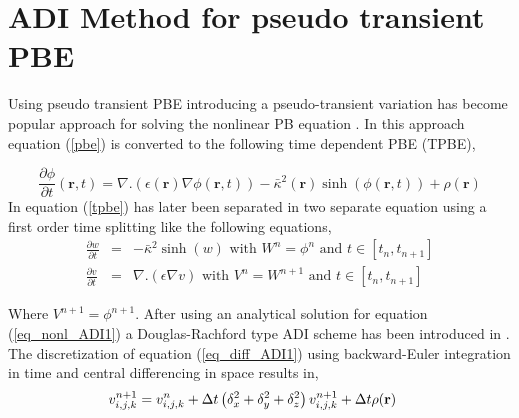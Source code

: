 
\section{ADI Method for pseudo transient PBE}

Using pseudo transient PBE introducing a pseudo-transient variation has become popular approach for solving the nonlinear PB equation \cite{Sayyed-Ahmad2004, Shestakov2002, zhao_pseudo-time-coupled_2011, zhao_operator_2014}. In this approach equation (\ref{pbe}) is converted to the following time dependent PBE (TPBE),

\begin{equation}
			\frac{\partial \phi}{\partial t}(\textbf{r},t)=\nabla.(\epsilon(\textbf{r})\nabla \phi(\textbf{r},t))-\bar\kappa^2(\textbf{r}) \sinh (\phi(\textbf{r},t))+\rho(\textbf{r})\label{tpbe} %
\end{equation}
In \cite{geng_fully_2013} equation (\ref{tpbe}) has later been separated in two separate equation using a first order time splitting like the following equations, 
\begin{eqnarray}
  \frac{\partial w}{\partial t}&=& -\bar\kappa^2 \sinh(w) \text{ with } W^n=\phi^n\text{ and } t \in \left[t_n,t_{n+1}\right]\label{eq_nonl_ADI1}\\
 \frac{\partial v}{\partial t}&=&  \nabla . (\epsilon\nabla v) \text{ with } V^n=W^{n+1}\text{ and } t \in \left[t_n,t_{n+1}\right]	 \label{eq_diff_ADI1}
\end{eqnarray}  

Where $V^{n+1} = \phi^{n+1}$. After using an analytical solution for equation (\ref{eq_nonl_ADI1}) a Douglas-Rachford type ADI scheme has been introduced in \cite{geng_fully_2013}. The discretization of equation (\ref{eq_diff_ADI1}) using backward-Euler integration in time and central differencing in space results in, 
\begin{eqnarray}
	v_{i,j,k}^{n+1} &=v_{i,j,k}^{n}+\Delta t \left(\delta_x^2+\delta_y^2+\delta_z^2\right)v_{i,j,k}^{n+1}+\Delta t \rho({\bf r}) \label{imp-eu}
\end{eqnarray}

